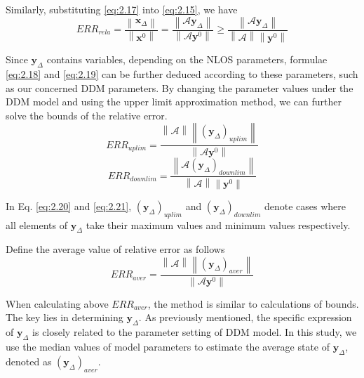 \documentclass[journal]{IEEEtran}
\begin{document}
Similarly, substituting \eqref{eq:2.17} into \eqref{eq:2.15}, we have
\begin{equation}\label{eq:2.19}
{ERR}_{rela} = \frac{\left\| \mathbf{x}_{\Delta} \right\|}{\left\| \mathbf{x}^0 \right\|} = \frac{\left\| \mathbf{\mathcal{A}}\mathbf{y}_{\Delta} \right\|}{\left\| \mathbf{\mathcal{A}}\mathbf{y}^0 \right\|} \geq \frac{\left\| \mathbf{\mathcal{A}}\mathbf{y}_{\Delta}\right\|}{\left\|\mathbf{\mathcal{A}}\right\| \left\| \mathbf{y}^0 \right\|}
\end{equation}

Since ${\mathbf{y}_{\Delta}}$ contains variables, depending on the NLOS parameters, formulae \eqref{eq:2.18} and \eqref{eq:2.19} can be further deduced according to these parameters, such as our concerned DDM parameters. By changing the parameter values under the DDM model and using the upper limit approximation method, we can further solve the bounds of the relative error.
\begin{equation}\label{eq:2.20}
{ERR}_{uplim} = \frac{\left\|\mathbf{\mathcal{A}}\right\| \left\| (\mathbf{y}_{\Delta})_{uplim} \right\|}{\left\| \mathbf{\mathcal{A}} \mathbf{y}^0 \right\|}
\end{equation}
\begin{equation}\label{eq:2.21}
{ERR}_{downlim} =  \frac{\left\| \mathbf{\mathcal{A}}(\mathbf{y}_{\Delta})_{downlim}\right\|}{\left\|\mathbf{\mathcal{A}}\right\| \left\| \mathbf{y}^0 \right\|}
\end{equation}

In Eq. \eqref{eq:2.20} and \eqref{eq:2.21}, $\left(\mathbf{y}_{\Delta}\right)_{uplim}$ and $\left(\mathbf{y}_{\Delta}\right)_{downlim}$ denote cases where all elements of $\mathbf{y}_{\Delta}$ take their maximum values and minimum values respectively.

Define the average value of relative error as follows
\begin{equation}\label{eq:2.22}
   ERR_{aver}=\frac{\left\|\mathbf{\mathcal{A}}\right\|\left\|\left(\mathbf{y}_{\Delta}\right)_{aver}\right\|}{\left\|\mathbf{\mathcal{A}}\mathbf{y}^0\right\|}
\end{equation}

When calculating above $ERR_{aver}$, the method is similar to calculations of bounds. The key lies in determining $\mathbf{y}_{\Delta}$. As previously mentioned, the specific expression of $\mathbf{y}_{\Delta}$ is closely related to the parameter setting of DDM model. In this study, we use the median values of model parameters to estimate the average state of $\mathbf{y}_{\Delta}$, denoted as $\left(\mathbf{y}_{\Delta}\right)_{aver}$.
\end{document}
